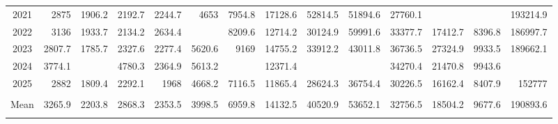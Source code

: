\begin{longtable}[t]{crrrrrrrrrrrrr}
2021 & 2875 & 1906.2 & 2192.7 & 2244.7 & 4653 & 7954.8 & 17128.6 & 52814.5 & 51894.6 & 27760.1 & \cellcolor{green}{13800.1} & \cellcolor{green}{7990.6} & 193214.9\\
2022 & 3136 & 1933.7 & 2134.2 & 2634.4 & \cellcolor{red}{6932} & 8209.6 & 12714.2 & 30124.9 & 59991.6 & 33377.7 & 17412.7 & 8396.8 & 186997.7\\
2023 & 2807.7 & 1785.7 & 2327.6 & 2277.4 & 5620.6 & 9169 & 14755.2 & 33912.2 & 43011.8 & 36736.5 & 27324.9 & 9933.5 & 189662.1\\
2024 & 3774.1 & \cellcolor{red}{4653.2} & 4780.3 & 2364.9 & 5613.2 & \cellcolor{red}{11747} & 12371.4 & \cellcolor{red}{73798.4} & \cellcolor{red}{87198.6} & 34270.4 & 21470.8 & 9943.6 & \cellcolor{red}{271985.9}\\
2025 & 2882 & 1809.4 & 2292.1 & 1968 & 4668.2 & 7116.5 & 11865.4 & 28624.3 & 36754.4 & 30226.5 & 16162.4 & 8407.9 & 152777\\
\midrule
\cellcolor{red}{Max} & \cellcolor{red}{6163} & \cellcolor{red}{4653.2} & \cellcolor{red}{5684.7} & \cellcolor{red}{3316.5} & \cellcolor{red}{6932} & \cellcolor{red}{11747} & \cellcolor{red}{18094.7} & \cellcolor{red}{73798.4} & \cellcolor{red}{87198.6} & \cellcolor{red}{47607.8} & \cellcolor{red}{27907.2} & \cellcolor{red}{18732.8} & \cellcolor{red}{271985.9}\\
Mean & 3265.9 & 2203.8 & 2868.3 & 2353.5 & 3998.5 & 6959.8 & 14132.5 & 40520.9 & 53652.1 & 32756.5 & 18504.2 & 9677.6 & 190893.6\\
\cellcolor{green}{Min} & \cellcolor{green}{2353.2} & \cellcolor{green}{1645.2} & \cellcolor{green}{1994.7} & \cellcolor{green}{1899} & \cellcolor{green}{2148.8} & \cellcolor{green}{5261.4} & \cellcolor{green}{11184.9} & \cellcolor{green}{27471.2} & \cellcolor{green}{35994.2} & \cellcolor{green}{21981.1} & \cellcolor{green}{13800.1} & \cellcolor{green}{7990.6} & \cellcolor{green}{137906.2}\\*
\end{longtable}
